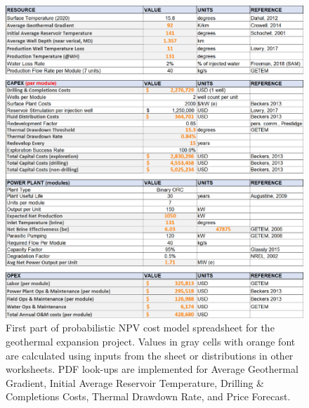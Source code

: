\begin{figure}[H]
\centering
\includegraphics[width=\textwidth]{templates/images/Figure-Flexible_Model_SheetA.pdf}
\caption[Probabilistic cost model spreadsheet (part 1)]{First part of probabilistic NPV cost model spreadsheet for the geothermal expansion project. Values in gray cells with orange font are calculated using inputs from the sheet or distributions in other worksheets. PDF look-ups are implemented for Average Geothermal Gradient, Initial Average Reservoir Temperature, Drilling \& Completions Costs, Thermal Drawdown Rate, and Price Forecast.}
\label{fig:probabilistic_model_sheet1}
\end{figure}

